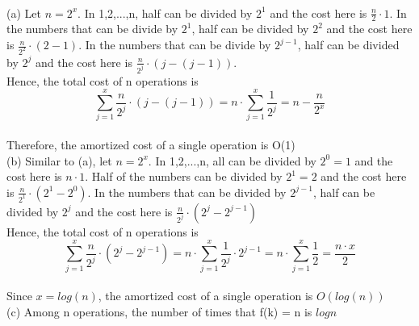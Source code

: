 \begin{problem}{5} ~\\
(a) Let $n=2^{x}$. In 1,2,...,n, half can be divided by $2^{1}$ and the cost here is $\frac{n}{2}\cdot1$. In the numbers that can be divide by $2^{1}$, half can be divided by $2^{2}$ and the cost here is $\frac{n}{2^{2}}\cdot(2-1)$. In the numbers that can be divide by $2^{j-1}$, half can be divided by $2^{j}$ and the cost here is $\frac{n}{2^{j}}\cdot(j-(j-1))$.\\
Hence, the total cost of n operations is 
$$\sum_{j=1}^{x} \frac{n}{2^{j}}\cdot(j-(j-1)) = n\cdot\sum_{j=1}^{x}\frac{1}{2^{j}} = n-\frac{n}{2^{x}}$$\\
Therefore, the amortized cost of a single operation is O(1)\\
(b) Similar to (a), let $n=2^{x}$. In 1,2,...,n, all can be divided by $2^{0}=1$ and the cost here is $n\cdot1$. Half of the numbers can be divided by $2^{1}=2$ and the cost here is $\frac{n}{2^{1}}\cdot(2^{1}-2^{0})$. In the numbers that can be divided by $2^{j-1}$, half can be divided by $2^{j}$ and the cost here is $\frac{n}{2^{j}}\cdot(2^{j}-2^{j-1})$\\
Hence, the total cost of n operations is
$$\sum_{j=1}^{x} \frac{n}{2^{j}}\cdot(2^{j}-2^{j-1}) = n\cdot\sum_{j=1}^{x}\frac{1}{2^{j}}\cdot2^{j-1} = n\cdot\sum_{j=1}^{x}\frac{1}{2} = \frac{n\cdot x}{2}$$\\
Since $x=log(n)$, the amortized cost of a single operation is $O(log(n))$\\
(c) Among n operations, the number of times that f(k) =  n is $logn$\\
\\

\end{problem}
